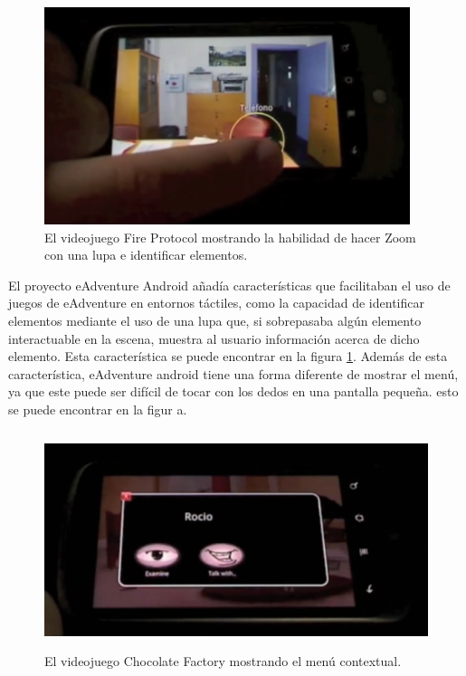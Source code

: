\begin{figure}[htb]
	\includegraphics[height=2.5in]{figures/eandroid.png}
	\caption[eAdventure Android - Lupa]{El videojuego Fire Protocol mostrando la habilidad de hacer Zoom con una lupa e identificar elementos.}
	\label{eandroidlupa}
\end{figure}

El proyecto eAdventure Android añadía características que facilitaban el uso de juegos de eAdventure en entornos táctiles, como la capacidad de identificar elementos mediante el uso de una lupa que, si sobrepasaba algún elemento interactuable en la escena, muestra al usuario información acerca de dicho elemento. Esta característica se puede encontrar en la figura \ref{eandroidlupa}. Además de esta característica, eAdventure android tiene una forma diferente de mostrar el menú, ya que este puede ser difícil de tocar con los dedos en una pantalla pequeña. esto se puede encontrar en la figur a\label{eandroidmenu}.

\begin{figure}[htb]
	\includegraphics[height=2.5in]{figures/eandroid-menu.png}
	\caption[eAdventure Android - Menu]{El videojuego Chocolate Factory mostrando el menú contextual.}
	\label{eandroidmenu}
\end{figure}

